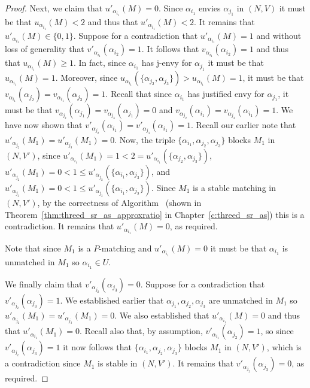\begin{proof}
Next, we claim that $u'_{\alpha_{i_1}}(M)=0$. Since $\alpha_{i_1}$ envies $\alpha_{j_1}$ in $(N, V)$ it must be that $u_{\alpha_{i_1}}(M)<2$ and thus that $u'_{\alpha_{i_1}}(M)<2$. It remains that $u'_{\alpha_{i_1}}(M) \in \{ 0, 1 \}$. Suppose for a contradiction that $u'_{\alpha_{i_1}}(M)=1$ and without loss of generality that $\mathit{v'}_{\alpha_{i_1}}(\alpha_{i_2})=1$. It follows that $v_{\alpha_{i_1}}(\alpha_{i_2})=1$ and thus that $u_{\alpha_{i_1}}(M) \geq 1$. In fact, since $\alpha_{i_1}$ has j-envy for $\alpha_{j_1}$ it must be that $u_{\alpha_{i_1}}(M) = 1$. Moreover, since $u_{\alpha_{i_1}}(\{ \alpha_{j_2}, \alpha_{j_3} \}) > u_{\alpha_{i_1}}(M)=1$, it must be that $v_{\alpha_{i_1}}(\alpha_{j_2})=v_{\alpha_{i_1}}(\alpha_{j_3})=1$. Recall that since $\alpha_{i_1}$ has justified envy for $\alpha_{j_1}$, it must be that $v_{\alpha_{j_2}}(\alpha_{j_1})=v_{\alpha_{j_3}}(\alpha_{j_1})=0$ and $v_{\alpha_{j_2}}(\alpha_{i_1})=v_{\alpha_{j_3}}(\alpha_{i_1})=1$. We have now shown that $\mathit{v'}_{\alpha_{j_2}}(\alpha_{i_1})=\mathit{v'}_{\alpha_{j_3}}(\alpha_{i_1})=1$. Recall our earlier note that $u'_{\alpha_{j_2}}(M_1)=u'_{\alpha_{j_3}}(M_1)=0$. Now, the triple $\{ \alpha_{i_1}, \alpha_{j_2}, \alpha_{j_3} \}$ blocks $M_1$ in $(N, V')$, since $u'_{\alpha_{i_1}}(M_1) = 1 < 2 = u'_{\alpha_{i_1}}(\{ \alpha_{j_2}, \alpha_{j_3} \})$, $u'_{\alpha_{j_2}}(M_1) = 0 < 1 \leq u'_{\alpha_{j_2}}(\{ \alpha_{i_1}, \alpha_{j_3} \})$, and $u'_{\alpha_{j_3}}(M_1) = 0 < 1 \leq u'_{\alpha_{j_3}}(\{ \alpha_{i_1}, \alpha_{j_2} \})$. Since $M_1$ is a stable matching in $(N, V')$, by the correctness of Algorithm~ (shown in Theorem~\ref{thm:threed_sr_as_approxratio} in Chapter~\ref{c:threed_sr_as}) this is a contradiction. It remains that $u'_{\alpha_{i_1}}(M)=0$, as required.

Note that since $M_1$ is a $P$\nobreakdash-matching and $u'_{\alpha_{i_1}}(M)=0$ it must be that $\alpha_{i_1}$ is unmatched in $M_1$ so $\alpha_{i_1} \in U$.

We finally claim that $\mathit{v'}_{\alpha_{j_2}}(\alpha_{j_3})=0$. Suppose for a contradiction that $\mathit{v'}_{\alpha_{j_2}}(\alpha_{j_3}) = 1$. We established earlier that $\alpha_{j_1}, \alpha_{j_2}, \alpha_{j_3}$ are unmatched in $M_1$ so $u'_{\alpha_{j_2}}(M_1)=u'_{\alpha_{j_3}}(M_1)=0$. We also established that $u'_{\alpha_{i_1}}(M)=0$ and thus that $u'_{\alpha_{i_1}}(M_1)=0$. Recall also that, by assumption, $\mathit{v'}_{\alpha_{i_1}}(\alpha_{j_2})=1$, so since $\mathit{v'}_{\alpha_{j_2}}(\alpha_{j_3})=1$ it now follows that $\{ \alpha_{i_1}, \alpha_{j_2}, \alpha_{j_3} \}$ blocks $M_1$ in $(N, V')$, which is a contradiction since $M_1$ is stable in $(N, V')$. It remains that $\mathit{v'}_{\alpha_{j_2}}(\alpha_{j_3})=0$, as required.


\end{proof}
